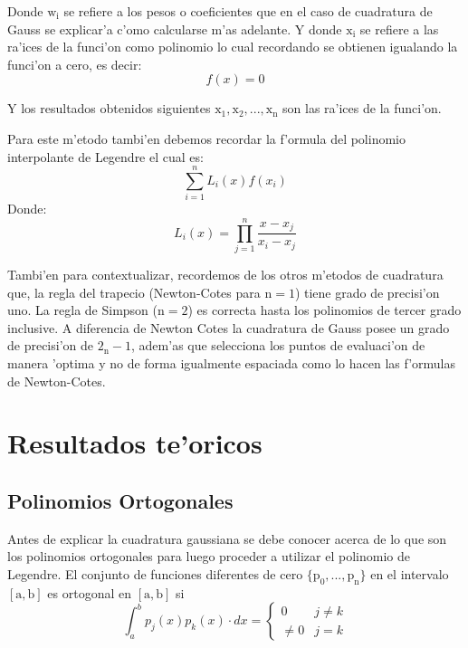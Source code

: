 \documentclass[12pt]{article}
\begin{document}
			Donde $\mathrm{w_{i}}$ se refiere a los pesos o coeficientes que en el caso de cuadratura de Gauss se explicar'a c'omo calcularse m'as adelante.
			Y donde $\mathrm{x_{i}}$ se refiere a las ra'ices de la funci'on como polinomio lo cual recordando se obtienen igualando la funci'on a cero, es decir:
			\begin{equation}\label{eq:eq2}
				f(x)=0
			\end{equation}
			
			Y los resultados obtenidos siguientes $\mathrm{x_{1}, x_{2},..., x_{n}}$ son las ra'ices de la funci'on.
			
			Para este m'etodo tambi'en debemos recordar la f'ormula del polinomio interpolante de Legendre el cual es:
			\begin{equation}\label{eq:eq3}
				\sum_{i=1}^{n}L_{i}(x)f(x_{i})
			\end{equation} 
			Donde:
			\begin{equation}
				L_{i}(x)=\prod_{j=1}^{n}\frac{x - x_{j}}{x_{i} - x_{j}}
			\end{equation}
			
			Tambi'en para contextualizar, recordemos de los otros m'etodos de cuadratura que, la regla del trapecio (Newton-Cotes para $\mathrm{n=1}$) tiene grado de precisi'on uno. La regla de Simpson ($\mathrm{n=2}$) es correcta hasta los polinomios de tercer grado inclusive. A diferencia de Newton Cotes la cuadratura de Gauss posee un grado de precisi'on de $\mathrm{2_{n}-1}$, adem'as que selecciona los puntos de evaluaci'on de manera 'optima y no de forma igualmente espaciada como lo hacen las f'ormulas de Newton-Cotes.
				
			
		\section*{Resultados te'oricos}
			\subsection*{Polinomios Ortogonales}
				Antes de explicar la cuadratura gaussiana se debe conocer acerca de lo que son los polinomios ortogonales para luego proceder a utilizar el polinomio de Legendre.
				El conjunto de funciones diferentes de cero $\mathrm{\lbrace p_{0}, ..., p_{n}\rbrace}$ en el intervalo $\mathrm{[a,b]}$ es ortogonal en $\mathrm{[a,b]}$ si
				\begin{equation}
					\int_{a}^{b}p_{j}(x)p_{k}(x)\cdot dx = \left\{\begin{array}{lcc}
						0 & j\ne k\\
						\ne 0 & j=k
					\end{array}
					\right.	
				\end{equation}
				
\end{document}
